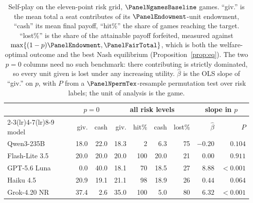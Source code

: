 \begin{table}[t]
\centering
\small
\setlength{\tabcolsep}{3.2pt}
\begin{tabular}{lrrrrrrrr}
\toprule
 & \multicolumn{2}{c}{$p=0$} & \multicolumn{4}{c}{all \PanelNrisks{} risk levels} & \multicolumn{2}{c}{slope in $p$} \\
\cmidrule(lr){2-3}\cmidrule(lr){4-7}\cmidrule(lr){8-9}
model & giv. & cash & giv. & hit\% & cash & lost\% & $\hat\beta$ & $P$ \\
\midrule
Qwen3-235B & 18.0 & 22.0 & 18.3 & 2 & 6.3 & 75 & $-0.20$ & $0.104$ \\
Flash-Lite 3.5 & 20.0 & 20.0 & 20.0 & 100 & 20.0 & 21 & $0.00$ & $0.911$ \\
GPT-5.6 Luna & 0.0 & 40.0 & 18.1 & 70 & 18.5 & 27 & $8.88$ & ${<}0.001$ \\
Haiku 4.5 & 20.9 & 19.1 & 21.1 & 98 & 18.9 & 26 & $0.44$ & $0.064$ \\
Grok-4.20 NR & 37.4 & 2.6 & 35.0 & 100 & 5.0 & 80 & $6.32$ & ${<}0.001$ \\
\bottomrule
\end{tabular}
\caption{Self-play on the eleven-point risk grid, $\PanelNgamesBaseline$ games. ``giv.'' is the mean total a seat contributes of its $\PanelEndowment$-unit endowment, ``cash'' its mean final payoff, ``hit\%'' the share of games reaching the target. ``lost\%'' is the share of the attainable payoff forfeited, measured against $\max\{(1-p)\PanelEndowment,\PanelFairTotal\}$, which is both the welfare-optimal outcome and the best Nash equilibrium (Proposition~\ref{prop:eq}). The two $p=0$ columns need no such benchmark: there contributing is strictly dominated, so every unit given is lost under any increasing utility. $\hat\beta$ is the OLS slope of ``giv.'' on $p$, with $P$ from a $\PanelNpermTex$-resample permutation test over risk labels; the unit of analysis is the game.}
\label{tab:grid}
\end{table}
